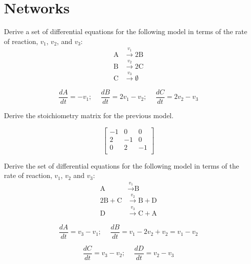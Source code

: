 \documentclass[12pt]{article}
\begin{document}
\section{Networks}


\begin{question}
Derive a set of differential equations for the following model in terms of the
rate of reaction, $v_1$, $v_2$, and $v_3$:
\begin{align*}
  \text{A} &\stackrel{v_1}{\rightarrow} 2 \text{B} \\
  \text{B} &\stackrel{v_2}{\rightarrow} 2 \text{C} \\
  \text{C} &\stackrel{v_3}{\rightarrow} \emptyset
\end{align*}
\end{question}
\begin{solution}
$$\frac{dA}{dt} =  -v_1;\ \quad \frac{dB}{dt} = 2 v_1 - v_2;\ \quad \frac{dC}{dt} = 2 v_2 - v_3 $$
\end{solution}


\begin{question}
Derive the stoichiometry matrix for the previous model.
\end{question}
\begin{solution}
\begin{equation*}
         \left[ \begin{array}{rrrr}
           -1 &  0 &  0 \\
            2 & -1 &  0 \\
            0 &  2 & -1 \\
         \end{array} \right]
\end{equation*}
\end{solution}


\begin{question}
Derive the set of differential equations for the following model in terms of the
rate of reaction, $v_1$, $v_2$ and $v_3$:
%
\begin{align*}
  \text{A} &\stackrel{v_1}{\rightarrow} \text{B} \\
  2 \text{B} + \text{C} &\stackrel{v_2}{\rightarrow} \text{B} + \text{D} \\
  \text{D} &\stackrel{v_3}{\rightarrow} \text{C} + \text{A}
\end{align*}
\end{question}
\begin{solution}
$$ \frac{dA}{dt} =  v_3 - v_1;\ \quad \frac{dB}{dt} = v_1 - 2 v_2 + v_2 = v_1 - v_2 $$

$$ \frac{dC}{dt} = v_3 - v_2;\ \quad \frac{dD}{dt} = v_2 - v_3 $$
\end{solution}
\end{document}
